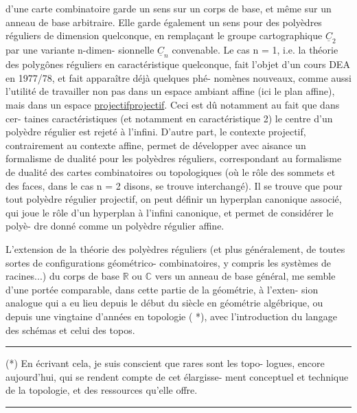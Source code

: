 \documentclass[11pt,a4paper]{article}
\newif\ifenglish
\def\CurrentApparatus{}
\let\TextUline\uline
\renewcommand{\uline}[1]{\ifmmode\underline{#1}\else\TextUline{#1}\fi}
\newcommand{\margin}[1]{%
  \sbox{\MarginalTestBox}{\parbox{\marginparwidth}{\raggedright\footnotesize#1}}%
  \ifdim\dimexpr\ht\MarginalTestBox+\dp\MarginalTestBox\relax>3\baselineskip
    \par\smallskip\noindent\begin{minipage}{\linewidth}\hrule\smallskip
    {\footnotesize\textcolor{HandInk}{\ifenglish Marginal note:\else Note marginale :\fi\ #1}}\smallskip\hrule\end{minipage}\par\smallskip
  \else
    \marginnote{\raggedright\footnotesize\textcolor{HandInk}{#1}}%
  \fi}
\newcommand{\finishscan}{\ifx\CurrentApparatus\empty\else\par\bigskip\noindent\rule{.35\linewidth}{.35pt}\par\smallskip{\footnotesize\setlength{\parskip}{3pt}\CurrentApparatus}\fi}
\begin{document}
d'une carte combinatoire garde un sens sur un corps de base, et
même sur un anneau de base arbitraire. Elle garde également un
sens pour des polyèdres réguliers de dimension quelconque, en
remplaçant le groupe cartographique $\underline{C}_2$ par une variante n-dimen-%
sionnelle $\underline{C}_n$ convenable. Le cas n = 1, i.e. la théorie des
polygônes réguliers en caractéristique quelconque, fait l'objet
d'un cours DEA en 1977/78, et fait apparaître déjà quelques phé-%
nomènes nouveaux, comme aussi l'utilité de travailler non pas
dans un espace ambiant affine (ici le plan affine), mais dans
un espace \uline{projectif}. Ceci est dû notamment au fait que dans cer-%
taines caractéristiques (et notamment en caractéristique 2) le
centre d'un polyèdre régulier est rejeté à l'infini. D'autre
part, le contexte projectif, contrairement au contexte affine,
permet de développer avec aisance un formalisme de dualité pour
les polyèdres réguliers, correspondant au formalisme de dualité
des cartes combinatoires ou topologiques (où le rôle des sommets
et des faces, dans le cas n = 2 disons, se trouve interchangé).
Il se trouve que pour tout polyèdre régulier projectif, on peut
définir un hyperplan canonique associé, qui joue le rôle d'un
hyperplan à l'infini canonique, et permet de considérer le polyè-%
dre donné comme un polyèdre régulier affine.

L'extension de la théorie des polyèdres réguliers (et
plus généralement, de toutes sortes de configurations géométrico-%
combinatoires, y compris les systèmes de racines...) du corps de
base $\mathbb{R}$ ou $\mathbb{C}$ vers un anneau de base général, me semble d'une
portée comparable, dans cette partie de la géométrie, à l'exten-%
sion analogue qui a eu lieu depuis le début du siècle en géométrie
algébrique, ou depuis une vingtaine d'années en topologie ( *),
avec l'introduction du langage des schémas et celui des topos.

\rule{4cm}{0.4pt}

(*) En écrivant cela, je suis conscient que rares sont les topo-%
logues, encore aujourd'hui, qui se rendent compte de cet élargisse-%
ment conceptuel et technique de la topologie, et des ressources
qu'elle offre.

\margin{22}

\finishscan
\end{document}
